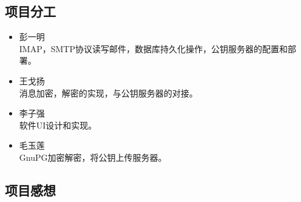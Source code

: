\documentclass[a4paper,UTF8]{article}
\begin{document}
\subsection{项目分工}
\begin{itemize}
	\item 彭一明
	\\IMAP，SMTP协议读写邮件，数据库持久化操作，公钥服务器的配置和部署。
	\item 王戈扬
	\\消息加密，解密的实现，与公钥服务器的对接。

	\item 李子强
	\\软件UI设计和实现。

	\item 毛玉莲
	\\GnuPG加密解密，将公钥上传服务器。
\end{itemize}
\subsection{项目感想}
\end{document}
